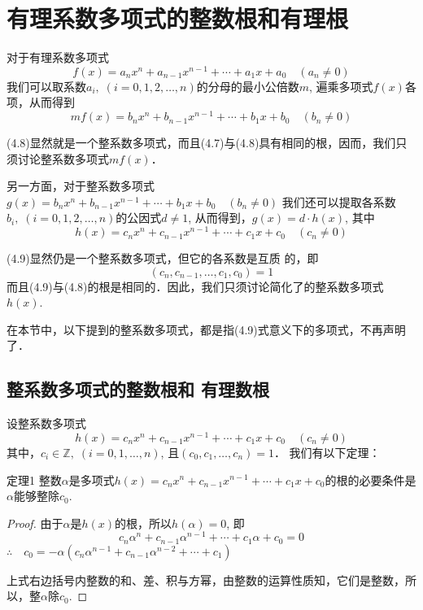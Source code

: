 \section{有理系数多项式的整数根和有理根}
对于有理系数多项式
\begin{equation}
    f(x)=a_nx^n+a_{n-1}x^{n-1}+\cdots+a_1x+a_0\quad (a_n\ne 0)
\end{equation}
我们可以取系数$a_i,\; (i=0, 1, 2,\ldots,n)$的分母的最小公倍数$m$, 遍乘多项式$f(x)$各项，从而得到
\begin{equation}
    mf(x)=b_nx^n+b_{n-1}x^{n-1}+\cdots+b_1x+b_0\quad (b_n\ne 0)
\end{equation}

(4.8)显然就是一个整系数多项式，而且(4.7)与(4.8)具有相同的根，因而，我们只须讨论整系数多项式$mf(x)$．

另一方面，对于整系数多项式$g (x) =b_nx^n+b_{n-1}x^{n-1}+\cdots+b_1x+b_0\quad (b_n\ne 0)$
我们还可以提取各系数$b_i,\; (i=0, 1, 2,\ldots,n)$的公因式$d\ne 1$, 从而得到，$g(x)=d\cdot h(x)$, 其中
\begin{equation}
    h (x) =c_nx^n+c_{n-1}x^{n-1}+\cdots+c_1x+c_0\quad (c_n\ne 0)
\end{equation}

(4.9)显然仍是一个整系数多项式，但它的各系数是互质
的，即$$(c_n,c_{n-1},\ldots,c_1,c_0)=1$$ 而且(4.9)与(4.8)的根是相同的．因此，我们只须讨论简化了的整系数多项式$h(x)$.

在本节中，以下提到的整系数多项式，都是指(4.9)式意义下的多项式，不再声明了．

\subsection{整系数多项式的整数根和 有理数根}

设整系数多项式
\[ h (x) =c_nx^n+c_{n-1}x^{n-1}+\cdots+c_1x+c_0\quad (c_n\ne 0)\]
其中，$c_i\in\mathbb{Z}, \;(i=0, 1,\ldots,n)$, 且$(c_0,c_1,\ldots,c_n)=1$．
我们有以下定理：

\begin{blk}{定理1}
    整数$\alpha$是多项式$h (x) =c_nx^n+c_{n-1}x^{n-1}+\cdots+c_1x+c_0$的根的必要条件是$\alpha$能够整除$c_0$.
\end{blk}

\begin{proof}
    由于$\alpha$是$h(x)$的根，所以$h(\alpha)=0$, 即
\[c_n\alpha^n+c_{n-1}\alpha^{n-1}+\cdots+c_1\alpha+c_0=0\]
$\therefore\quad c_0=-\alpha\left(c_n\alpha^{n-1}+c_{n-1}\alpha^{n-2}+\cdots+c_1\right)$

上式右边括号内整数的和、差、积与方幂，由整数的运算性质知，它们是整数，所以，整$\alpha$除$c_0$.
\end{proof}


